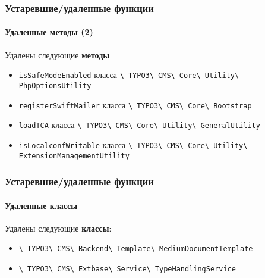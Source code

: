 \begin{frame}[fragile]
	\frametitle{Устаревшие/удаленные функции}
	\framesubtitle{Удаленные методы (2)}

	Удалены следующие \textbf{методы}

	\begin{itemize}

		\item
			\small
				\texttt{isSafeModeEnabled}\newline
				класса
				\texttt{\textbackslash
					TYPO3\textbackslash
					CMS\textbackslash
					Core\textbackslash
					Utility\textbackslash
					PhpOptionsUtility}
			\normalsize
		\item
			\small
				\texttt{registerSwiftMailer}\newline
				класса
				\texttt{\textbackslash
					TYPO3\textbackslash
					CMS\textbackslash
					Core\textbackslash
					Bootstrap}
			\normalsize
		\item
			\small
				\texttt{loadTCA}\newline
				класса
				\texttt{\textbackslash
					TYPO3\textbackslash
					CMS\textbackslash
					Core\textbackslash
					Utility\textbackslash
					GeneralUtility}
			\normalsize
		\item
			\small
				\texttt{isLocalconfWritable}\newline
				класса
				\texttt{\textbackslash
					TYPO3\textbackslash
					CMS\textbackslash
					Core\textbackslash
					Utility\textbackslash
					ExtensionManagementUtility}
			\normalsize

	\end{itemize}

\end{frame}


\begin{frame}[fragile]
	\frametitle{Устаревшие/удаленные функции}
	\framesubtitle{Удаленные классы}

	Удалены следующие \textbf{классы}:

	\begin{itemize}

		\item
			\smaller
				\texttt{\textbackslash
					TYPO3\textbackslash
					CMS\textbackslash
					Backend\textbackslash
					Template\textbackslash
					MediumDocumentTemplate}
			\normalsize
		\item
			\smaller
				\texttt{\textbackslash
					TYPO3\textbackslash
					CMS\textbackslash
					Extbase\textbackslash
					Service\textbackslash
					TypeHandlingService}
			\normalsize

	\end{itemize}

\end{frame}

